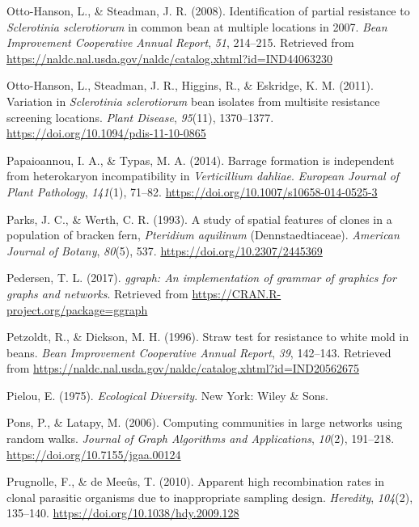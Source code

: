 \hypertarget{ref-otto2008identification}{}
Otto-Hanson, L., \& Steadman, J. R. (2008). Identification of partial
resistance to \emph{Sclerotinia sclerotiorum} in common bean at multiple
locations in 2007. \emph{Bean Improvement Cooperative Annual Report},
\emph{51}, 214--215. Retrieved from
\url{https://naldc.nal.usda.gov/naldc/catalog.xhtml?id=IND44063230}

\hypertarget{ref-otto-hanson2011variation}{}
Otto-Hanson, L., Steadman, J. R., Higgins, R., \& Eskridge, K. M.
(2011). Variation in \emph{Sclerotinia sclerotiorum} bean isolates from
multisite resistance screening locations. \emph{Plant Disease},
\emph{95}(11), 1370--1377. \url{https://doi.org/10.1094/pdis-11-10-0865}

\hypertarget{ref-papaioannou2014barrage}{}
Papaioannou, I. A., \& Typas, M. A. (2014). Barrage formation is
independent from heterokaryon incompatibility in \emph{Verticillium
dahliae}. \emph{European Journal of Plant Pathology}, \emph{141}(1),
71--82. \url{https://doi.org/10.1007/s10658-014-0525-3}

\hypertarget{ref-parks1993study}{}
Parks, J. C., \& Werth, C. R. (1993). A study of spatial features of
clones in a population of bracken fern, \emph{Pteridium aquilinum}
(Dennstaedtiaceae). \emph{American Journal of Botany}, \emph{80}(5),
537. \url{https://doi.org/10.2307/2445369}

\hypertarget{ref-ggraph}{}
Pedersen, T. L. (2017). \emph{ggraph: An implementation of grammar of
graphics for graphs and networks}. Retrieved from
\url{https://CRAN.R-project.org/package=ggraph}

\hypertarget{ref-petzoldt1996straw}{}
Petzoldt, R., \& Dickson, M. H. (1996). Straw test for resistance to
white mold in beans. \emph{Bean Improvement Cooperative Annual Report},
\emph{39}, 142--143. Retrieved from
\url{https://naldc.nal.usda.gov/naldc/catalog.xhtml?id=IND20562675}

\hypertarget{ref-pielou1975ecological}{}
Pielou, E. (1975). \emph{Ecological Diversity}. New York: Wiley \& Sons.

\hypertarget{ref-pons2006computing}{}
Pons, P., \& Latapy, M. (2006). Computing communities in large networks
using random walks. \emph{Journal of Graph Algorithms and Applications},
\emph{10}(2), 191--218. \url{https://doi.org/10.7155/jgaa.00124}

\hypertarget{ref-prugnolle2010apparent}{}
Prugnolle, F., \& de Meeûs, T. (2010). Apparent high recombination rates
in clonal parasitic organisms due to inappropriate sampling design.
\emph{Heredity}, \emph{104}(2), 135--140.
\url{https://doi.org/10.1038/hdy.2009.128}

